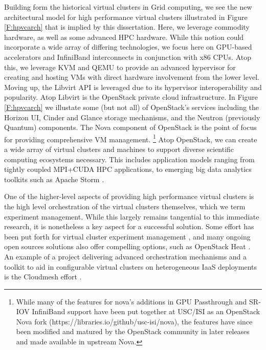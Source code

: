 Building form the historical virtual clusters in Grid computing, we see the new architectural model for high performance virtual clusters illustrated in Figure \ref{F:hpvcarch} that is implied by this dissertation.  Here, we leverage commodity hardware, as well as some advanced HPC hardware. While this notion could incorporate a wide array of differing technologies, we focus here on GPU-based accelerators and InfiniBand interconnects in conjunction with x86 CPUs. Atop this, we leverage KVM and QEMU to provide an advanced hypervisor for creating and hosting VMs with direct hardware involvement from the lower level. Moving up, the Libvirt API is leveraged due to its hypervisor interoperability and popularity. Atop Libvirt is the OpenStack private cloud infrastructure. In Figure \ref{F:hpvcarch} we illustate some (but not all) of OpenStack's services including the Horizon UI, Cinder and Glance storage mechanisms, and the Neutron (previously Quantum) components. The Nova component of OpenStack is the point of focus for providing comprehensive VM management.
\footnote{While many of the features for nova's additions in GPU Passthrough and SR-IOV InfiniBand support have been put together at USC/ISI as an OpenStack Nova fork (https://libraries.io/github/usc-isi/nova), the features have since been modified and matured by the OpenStack community in later releases and made available in upstream Nova.}  Atop OpenStack, we can create a wide array of virtual clusters and machines to support diverse scientific computing ecosystems necessary. This includes application models ranging from tightly coupled MPI+CUDA HPC applications, to emerging big data analytics toolkits such as Apache Storm \cite{kamburugamuve2016streaming}. 

One of the higher-level aspects of providing high performance virtual clusters is the high level orchestration of the virtual clusters themselves, which we term experiment management. While this largely remains tangential to this immediate research, it is nonetheless a key aspect for a successful solution. Some effort has been put forth for virtual cluster experiment management \cite{las2010gce}, and many ongoing open sources solutions also offer compelling options, such as OpenStack Heat \cite{www-openstack-heat}.  An example of a project delivering advanced orchestration mechanisms and a toolkit to aid in configurable virtual clusters on heterogeneous IaaS deployments is the Cloudmesh effort \cite{von2014cloudmesh}.  


